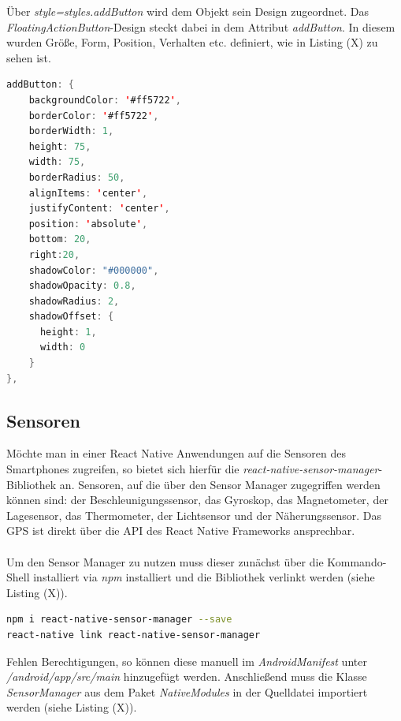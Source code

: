 Über \textit{style=styles.addButton} wird dem Objekt sein Design zugeordnet. Das \textit{FloatingActionButton}-Design steckt dabei in dem Attribut \textit{addButton}. In diesem wurden Größe, Form, Position, Verhalten etc. definiert, wie in Listing (X) zu sehen ist.

\begin{lstlisting}[caption=Das \textit{FloatingActionButton}-Design, label=lst:FABDesignReactNative, language=Java]
addButton: {
    backgroundColor: '#ff5722',
    borderColor: '#ff5722',
    borderWidth: 1,
    height: 75,
    width: 75,
    borderRadius: 50,
    alignItems: 'center',
    justifyContent: 'center',
    position: 'absolute',
    bottom: 20,
    right:20,
    shadowColor: "#000000",
    shadowOpacity: 0.8,
    shadowRadius: 2,
    shadowOffset: {
      height: 1,
      width: 0
    }
},
\end{lstlisting} 

\subsection*{Sensoren}

Möchte man in einer React Native Anwendungen auf die Sensoren des Smartphones zugreifen, so bietet sich hierfür die \textit{react-native-sensor-manager}-Bibliothek an. Sensoren, auf die über den Sensor Manager zugegriffen werden können sind: der Beschleunigungssensor, das Gyroskop, das Magnetometer, der Lagesensor, das Thermometer, der Lichtsensor und der Näherungssensor. Das GPS ist direkt über die API des React Native Frameworks ansprechbar. 
\\
\\
Um den Sensor Manager zu nutzen muss dieser zunächst über die Kommando-Shell installiert via \textit{npm} installiert und die Bibliothek verlinkt werden (siehe Listing (X)).

\begin{lstlisting}[caption=Installation und Verlinkung der Bibliothek \textit{react-native-sensor-manager}, label=lst:InstallationSensorManagerRN, language=bash]
npm i react-native-sensor-manager --save
react-native link react-native-sensor-manager
\end{lstlisting}

Fehlen Berechtigungen, so können diese manuell im \textit{AndroidManifest} unter \textit{/android/app/src/main} hinzugefügt werden. Anschließend muss die Klasse \textit{SensorManager} aus dem Paket \textit{NativeModules} in der Quelldatei importiert werden (siehe Listing (X)). 

